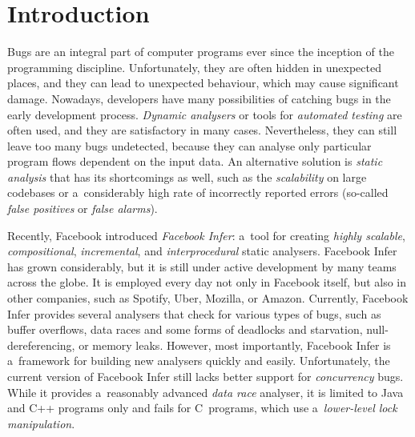 

\section{Introduction}

Bugs are an integral part of computer programs ever since the inception of the
programming discipline. Unfortunately, they are often hidden in unexpected
places, and they can lead to unexpected behaviour, which may cause significant
damage. Nowadays, developers have many possibilities of catching bugs in the
early development process. \emph{Dynamic analysers} or tools for \emph{automated
testing} are often used, and they are satisfactory in many cases. Nevertheless,
they can still leave too many bugs undetected, because they can analyse
only particular program flows dependent on the input data. An alternative
solution is \emph{static analysis} that has its shortcomings as well, such
as the \emph{scalability} on large codebases or a~considerably high rate of
incorrectly reported errors (so-called \emph{false positives} or \emph{false
alarms}).

Recently, Facebook introduced \emph{Facebook Infer}: a~tool for
creating \emph{highly scalable}, \emph{compositional}, \emph{incremental},
and \emph{interprocedural} static analysers. Facebook Infer has grown
considerably, but it is still under active development by many teams across
the globe. It is employed every day not only in Facebook itself, but also
in other companies, such as Spotify, Uber, Mozilla, or Amazon. Currently,
Facebook Infer provides several analysers that check for various types
of bugs, such as buffer overflows, data races and some forms of deadlocks
and starvation, null-dereferencing, or memory leaks. However, most importantly,
Facebook Infer is a~framework for building new analysers quickly and easily.
Unfortunately, the current version of Facebook Infer still lacks better
support for \emph{concurrency} bugs. While it provides a~reasonably advanced
\emph{data race} analyser, it is limited to Java and C++ programs only and
fails for C~programs, which use a~\emph{lower-level lock manipulation}.

